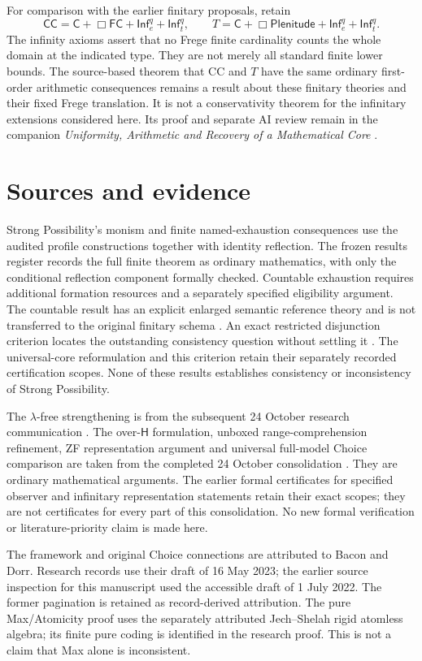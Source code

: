\documentclass[12pt,letterpaper]{article}
\newcommand{\Hlogic}{\mathsf H}
\newcommand{\C}{\mathsf C}
\newcommand{\CC}{\mathsf{CC}}
\newcommand{\FC}{\mathsf{FC}}
\newcommand{\Plen}{\mathsf{Plenitude}}
\newcommand{\Infq}{\mathsf{Inf}^{q}}
\begin{document}
For comparison with the earlier finitary proposals, retain
\[
 \CC=\C+\Box\FC+\Infq_e+\Infq_t,\qquad
 T=\C+\Box\Plen+\Infq_e+\Infq_t.
\]
The infinity axioms assert that no Frege finite cardinality counts the whole domain at the indicated type. They are not merely all standard finite lower bounds. The source-based theorem that CC and $T$ have the same ordinary first-order arithmetic consequences remains a result about these finitary theories and their fixed Frege translation. It is not a conservativity theorem for the infinitary extensions considered here. Its proof and separate AI review remain in the companion \emph{Uniformity, Arithmetic and Recovery of a Mathematical Core} \citep{uniformitynote}.

\section{Sources and evidence}\label{app:sources}

Strong Possibility's monism and finite named-exhaustion consequences use the audited profile constructions together with identity reflection. The frozen results register records the full finite theorem as ordinary mathematics, with only the conditional reflection component formally checked. Countable exhaustion requires additional formation resources and a separately specified eligibility argument. The countable result has an explicit enlarged semantic reference theory and is not transferred to the original finitary schema \citep[\S\S2--5]{spexhaustion}. An exact restricted disjunction criterion locates the outstanding consistency question without settling it \citep[\S5]{spcore}. The universal-core reformulation and this criterion retain their separately recorded certification scopes. None of these results establishes consistency or inconsistency of Strong Possibility.

The $\lambda$-free strengthening is from the subsequent 24 October research communication \citep{lambdahandoff}. The over-$\Hlogic$ formulation, unboxed range-comprehension refinement, ZF representation argument and universal full-model Choice comparison are taken from the completed 24 October consolidation \citep{intrinsic}. They are ordinary mathematical arguments. The earlier formal certificates for specified observer and infinitary representation statements retain their exact scopes; they are not certificates for every part of this consolidation. No new formal verification or literature-priority claim is made here.

The framework and original Choice connections are attributed to Bacon and Dorr. Research records use their draft of 16 May 2023; the earlier source inspection for this manuscript used the accessible draft of 1 July 2022. The former pagination is retained as record-derived attribution. The pure Max/Atomicity proof uses the separately attributed Jech--Shelah rigid atomless algebra; its finite pure coding is identified in the research proof. This is not a claim that Max alone is inconsistent.
\end{document}
